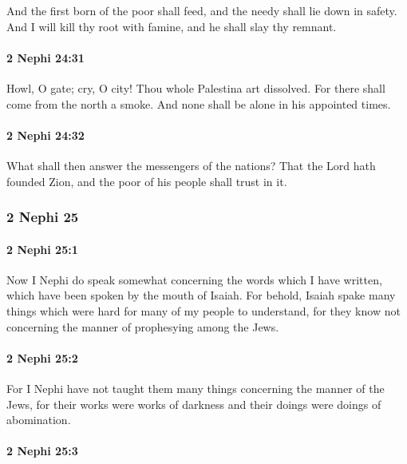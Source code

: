 			And the first born of the poor shall feed,
			and the needy shall lie down in safety.
			And I will kill thy root with famine,
			and he shall slay thy remnant.

		\paragraph{2 Nephi 24:31} %
			\label{2NEPHI-24-31}

			Howl, O gate; cry, O city!
			Thou whole Palestina art dissolved.
			For there shall come from the north a smoke.
			And none shall be alone in his appointed times.

		\paragraph{2 Nephi 24:32} %
			\label{2NEPHI-24-32}

			What shall then answer the messengers of the nations?
			That the Lord hath founded Zion,
			and the poor of his people shall trust in it.

	\subsubsection{2 Nephi 25} %
		\label{2NEPHI-25}
		
		\paragraph{2 Nephi 25:1} %
			\label{2NEPHI-25-1}

			Now I Nephi do speak somewhat
			concerning the words which I have written,
			which have been spoken by the mouth of Isaiah.
			For behold, Isaiah spake many things which were hard
			for many of my people to understand,
			for they know not concerning the manner of prophesying among the Jews.

		\paragraph{2 Nephi 25:2} %
			\label{2NEPHI-25-2}

			For I Nephi have not taught them many things concerning the manner of the Jews,
			for their works were works of darkness
			and their doings were doings of abomination.

		\paragraph{2 Nephi 25:3} %
			\label{2NEPHI-25-3}

